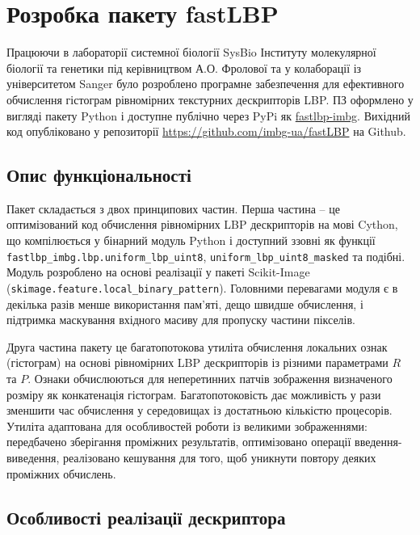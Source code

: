 \section{Розробка пакету fastLBP}\label{section2.2}

Працюючи в лабораторії системної біології SysBio Інституту молекулярної біології та генетики під керівництвом А.О. Фролової 
та у колаборації із університетом Sanger було розроблено програмне забезпечення для ефективного обчислення гістограм 
рівномірних текстурних дескрипторів LBP.
ПЗ оформлено у вигляді пакету Python і доступне публічно через PyPi як \href{https://pypi.org/project/fastlbp-imbg/}{fastlbp-imbg}.
Вихідний код опубліковано у репозиторії \url{https://github.com/imbg-ua/fastLBP} на Github.

\subsection{Опис функціональності}\label{section2.2a}\hfill

Пакет складається з двох принципових частин. 
Перша частина -- це оптимізований код обчислення рівномірних LBP дескрипторів на мові Cython, що компілюється у бінарний модуль Python 
і доступний ззовні як функції \verb|fastlbp_imbg.lbp.uniform_lbp_uint8|, \verb|uniform_lbp_uint8_masked| та подібні.
Модуль розроблено на основі реалізації у пакеті Scikit-Image (\verb|skimage.feature.local_binary_pattern|).
Головними перевагами модуля є в декілька разів менше використання пам'яті, дещо швидше обчислення, і підтримка маскування вхідного масиву для 
пропуску частини пікселів.

Друга частина пакету це багатопотокова утиліта обчислення локальних ознак (гістограм) на основі рівномірних LBP дескрипторів із різними параметрами $R$ та $P$.
Ознаки обчислюються для неперетинних патчів зображення визначеного розміру як конкатенація гістограм.
Багатопотоковість дає можливість у рази зменшити час обчислення у середовищах із достатньою кількістю процесорів.
Утиліта адаптована для особливостей роботи із великими зображеннями: 
передбачено зберігання проміжних результатів, оптимізовано операції введення-виведення, 
реалізовано кешування для того, щоб уникнути повтору деяких проміжних обчислень.

\subsection{Особливості реалізації дескриптора}\label{section2.2b}\hfill

